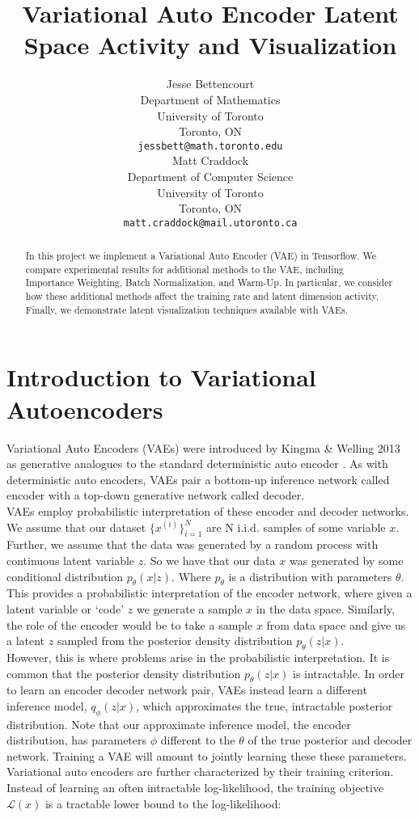 \documentclass{article} %
\title{Variational Auto Encoder Latent Space Activity and Visualization}
\author{
Jesse Bettencourt\\
Department of Mathematics\\
University of Toronto\\
Toronto, ON \\
\texttt{jessbett@math.toronto.edu} \\
\And
Matt Craddock\\
Department of Computer Science\\
University of Toronto\\
Toronto, ON \\
\texttt{matt.craddock@mail.utoronto.ca} \\
}
\renewcommand{\L}{\mathcal{L}}
\begin{document}
\maketitle

\begin{abstract}
In this project we implement a Variational Auto Encoder (VAE) in Tensorflow. We compare experimental results for additional methods to the VAE, including Importance Weighting, Batch Normalization, and Warm-Up. In particular, we consider how these additional methods affect the training rate and latent dimension activity. Finally, we demonstrate latent visualization techniques available with VAEs.
\end{abstract}

\section{Introduction to Variational Autoencoders}

Variational Auto Encoders (VAEs) were introduced by Kingma \& Welling 2013 as generative analogues to the standard deterministic auto encoder \cite{Kingma2013}. As with deterministic auto encoders, VAEs pair a bottom-up inference network called encoder with a top-down generative network called decoder.\\
VAEs employ probabilistic interpretation of these encoder and decoder networks. We assume that our dataset $\{x^{(i)}\}_{i=1}^N$ are N i.i.d. samples of some variable $x$. Further, we assume that the data was generated by a random process with continuous latent variable $z$. So we have that our data $x$ was generated by some conditional distribution $p_\theta(x|z)$. Where $p_\theta$ is a distribution with parameters $\theta$. This provides a probabilistic interpretation of the encoder network, where given a latent variable or `code' $z$ we generate a sample $x$ in the data space. Similarly, the role of the encoder would be to take a sample $x$ from data space and give us a latent $z$ sampled from the posterior density distribution $p_\theta(z|x)$.\\
However, this is where problems arise in the probabilistic interpretation. It is common that the posterior density distribution $p_\theta(z|x)$ is intractable. In order to learn an encoder decoder network pair, VAEs instead learn a different inference model, $q_\phi(z|x)$, which approximates the true, intractable posterior distribution. Note that our approximate inference model, the encoder distribution, has parameters $\phi$ different to the $\theta$ of the true posterior and decoder network. Training a VAE will amount to jointly learning these these parameters. \\
Variational auto encoders are further characterized by their training criterion. Instead of learning an often intractable log-likelihood, the training objective $\L(x)$ is a tractable lower bound to the log-likelihood:
\end{document}
